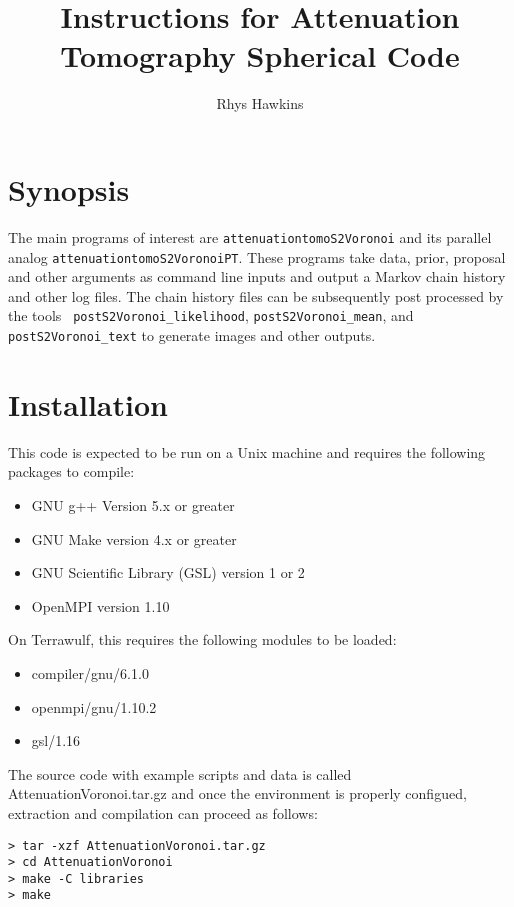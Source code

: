 \documentclass{article}
\begin{document}
\title{Instructions for Attenuation Tomography Spherical Code}
\author{Rhys Hawkins}

\maketitle

\section{Synopsis}

The main programs of interest are {\tt attenuationtomoS2Voronoi} and
its parallel analog {\tt attenuationtomoS2VoronoiPT}. These programs
take data, prior, proposal and other arguments as command line inputs
and output a Markov chain history and other log files. The chain
history files can be subsequently post processed by the tools {\tt
  postS2Voronoi\_likelihood}, {\tt postS2Voronoi\_mean}, and {\tt
  postS2Voronoi\_text} to generate images and other outputs.

\section{Installation}

This code is expected to be run on a Unix machine and requires the
following packages to compile:

\begin{itemize}
\item GNU g++ Version 5.x or greater
\item GNU Make version 4.x or greater
\item GNU Scientific Library (GSL) version 1 or 2
\item OpenMPI version 1.10
\end{itemize}

On Terrawulf, this requires the following modules to be loaded:
\begin{itemize}
\item compiler/gnu/6.1.0
\item openmpi/gnu/1.10.2
\item gsl/1.16
\end{itemize}

The source code with example scripts and data is called
AttenuationVoronoi.tar.gz and once the environment is properly
configued, extraction and compilation can proceed as follows:

\begin{verbatim}
> tar -xzf AttenuationVoronoi.tar.gz
> cd AttenuationVoronoi
> make -C libraries
> make
\end{verbatim}
\end{document}
